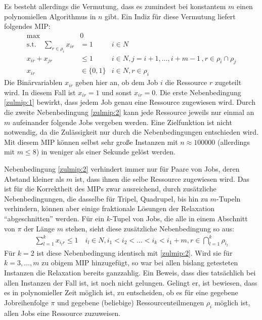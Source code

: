 \documentclass{scrreprt}
\begin{document}
Es besteht allerdings die Vermutung, dass es zumindest bei konstantem $m$ einen polynomiellen Algorithmus in $n$ gibt. Ein Indiz für diese Vermutung liefert folgendes MIP:
\begin{align}
    \text{max} \quad &0 \label{zulmip:obj} \\
    \text{s.t.}\quad \sum_{r\in\rho_i} x_{ir} &= 1 & i\in N \label{zulmip:1} \\
    x_{ir} + x_{jr} &\leq 1 & i\in N, j=i+1,\ldots,i+m-1 \, ,r\in\rho_i\cap\rho_j \label{zulmip:2} \\
    x_{ir} &\in \{0,1\} & i\in N, r\in\rho_i
\end{align}
Die Binärvariablen $x_{ir}$ geben hier an, ob dem Job $i$ die Ressource $r$ zugeteilt wird.
In diesem Fall ist $x_{ir}=1$ und sonst $x_{ir}=0$.
Die erste Nebenbedingung \ref{zulmip:1} bewirkt, dass jedem Job genau eine Ressource zugewiesen wird.
Durch die zweite Nebenbedingung \ref{zulmip:2} kann jede Ressource jeweils nur einmal an $m$ aufeinander folgende Jobs vergeben werden.
Eine Zielfunktion ist nicht notwendig, da die Zulässigkeit nur durch die Nebenbedingungen entschieden wird.
Mit diesem MIP können selbst sehr große Instanzen mit $n\approx 100000$ (allerdings mit $m\leq 8$) in weniger als einer Sekunde gelöst werden.

Nebenbedingung \ref{zulmip:2} verhindert immer nur für Paare von Jobs, deren Abstand kleiner als $m$ ist, dass ihnen die selbe Ressource zugewiesen wird.
Das ist für die Korrektheit des MIPs zwar ausreichend, durch zusätzliche Nebenbedingungen, die dasselbe für Tripel, Quadrupel, bis hin zu $m$-Tupeln verhindern,
können aber einige fraktionale Lösungen der Relaxation "`abgeschnitten"' werden.
Für ein $k$-Tupel von Jobs, die alle in einem Abschnitt von $\pi$ der Länge $m$ stehen, sieht diese zusätzliche Nebenbedingung so aus:
\begin{align}
    \sum_{l=1}^k x_{i_lr} \leq 1 \quad i_l\in N, i_1<i_2<\ldots<i_k<i_1+m, r\in\bigcap_{l=1}^k \rho_{i_l}
\end{align}
Für $k=2$ ist diese Nebenbedingung identisch mit \ref{zulmip:2}.
Wird sie für $k=3,\ldots,m$ zu obigem MIP hinzugefügt, so war bei allen bislang getesteten Instanzen die Relaxation bereits ganzzahlig.
Ein Beweis, dass dies tatsächlich bei allen Instanzen der Fall ist, ist noch nicht gelungen.
Gelingt er, ist bewiesen, dass es in polynomieller Zeit möglich ist, zu entscheiden, ob es für eine gegebene Jobreihenfolge $\pi$ und 
gegebene (beliebige) Ressourcenteilmengen $\rho_i$ möglich ist, allen Jobs eine Ressource zuzuweisen.
\end{document}
